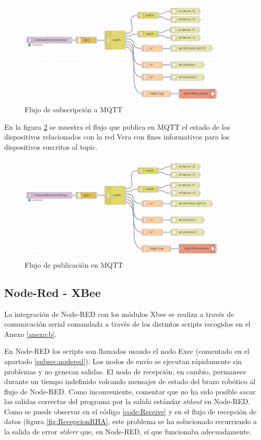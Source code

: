 \begin{figure}[hbt]
\centering
\includegraphics[width=0.9\textwidth]{figuras/MQTTFlowR.png}
\caption{Flujo de subscripción a MQTT}
\label{fig:MQTTFlowR}
\end{figure}

En la figura \ref{fig:MQTTFlowP} se muestra el flujo que publica en MQTT el estado de los dispositivos relacionados con la red Vera con fines informativos para los dispositivos suscritos al topic. 

\begin{figure}[hbt]
\centering
\includegraphics[width=0.9\textwidth]{figuras/MQTTFlowR.png}
\caption{Flujo de publicación en  MQTT}
\label{fig:MQTTFlowP}
\end{figure}

\subsection{Node-Red - XBee}\label{subsec:NR-Xbee}

La integración de Node-RED con los módulos Xbee se realiza a través de comunicación serial comandada a través de los distintos scripts recogidos en el Anexo \ref{anexo:b}.

En Node-RED los scripts son llamados usando el nodo Exec (comentado en el apartado \ref{subsec:nodered}). Los nodos de envío se ejecutan rápidamente sin problemas y no generan salidas. El nodo de recepción, en cambio, permanece durante un tiempo indefinido volcando mensajes de estado del brazo robótico al flujo de Node-RED. Como inconveniente, comentar que no ha sido posible sacar las salidas correctas del programa por la salida estándar \textit{stdout} en Node-RED. Como se puede observar en el código \ref{code:Receive} y en el flujo de recepción de datos (figura \ref{fig:RecepcionRHA}, este problema se ha solucionado recurriendo a la salida de error \textit{stderr} que, en Node-RED, sí que funcionaba adecuadamente.


